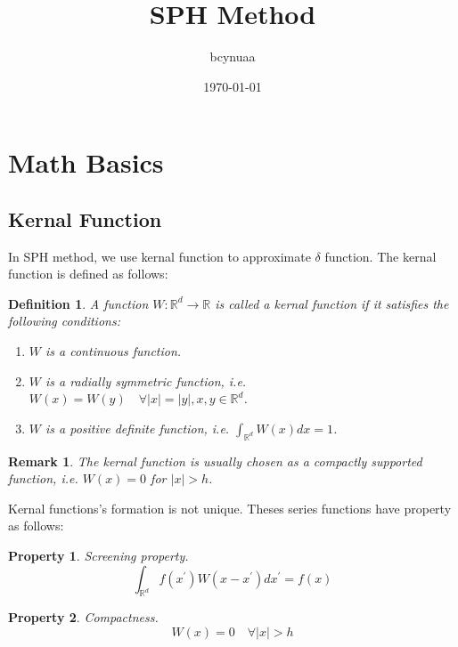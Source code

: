 \documentclass[10pt, oneside]{article}
\title{SPH Method}
\author{bcynuaa}
\date{\today}
\newcommand{\R}{\mathbb{R}}
\newtheorem{definition}{Definition} %
\newtheorem{property}{Property} %
\newtheorem{remark}{Remark} %
\begin{document}
\maketitle
\tableofcontents

\vspace{.25in}

\section{Math Basics}

\subsection{Kernal Function}

In SPH method, we use kernal function to approximate $\delta$ function. 
The kernal function is defined as follows:

\begin{definition}
    A function $W: \R^d \to \R$ is called a kernal function if it satisfies the following conditions:
    \begin{enumerate}
        \item $W$ is a continuous function.
        \item $W$ is a radially symmetric function, i.e. $W(x) = W(y) \quad \forall |x|=|y|, x, y \in \R^d$.
        \item $W$ is a positive definite function, i.e. $\int_{\R^d} W(x) dx = 1$.
    \end{enumerate}
\end{definition}

\begin{remark}
    The kernal function is usually chosen as a compactly supported function, i.e. $W(x) = 0$ for $|x| > h$.
\end{remark}

Kernal functions's formation is not unique. 
Theses series functions have property as follows:

\begin{property}
    Screening property.
    \begin{equation}
        \int_{\R^d} f(x^\prime)W(x-x^\prime) dx^\prime = f(x)
    \end{equation}
\end{property}

\begin{property}
    Compactness.
    \begin{equation}
        W(x)=0 \quad \forall |x| > h
    \end{equation}
\end{property}
\end{document}
